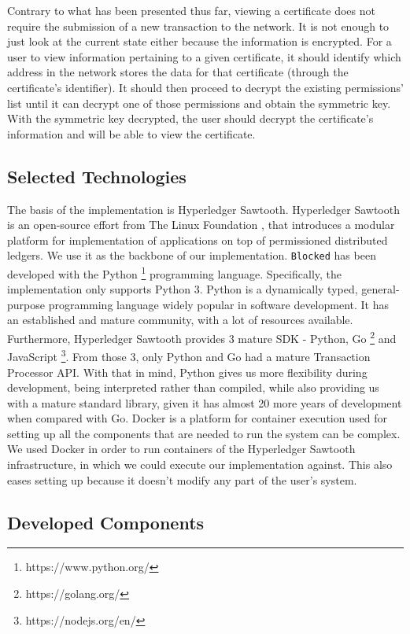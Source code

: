 Contrary to what has been presented thus far, viewing a certificate does not require the submission of a new transaction to the network. It is not enough to just look at the current state either because the information is encrypted. For a user to view information pertaining to a given certificate, it should identify which address in the network stores the data for that certificate (through the certificate's identifier). It should then proceed to decrypt the existing permissions' list until it can decrypt one of those permissions and obtain the symmetric key. With the symmetric key decrypted, the user should decrypt the certificate's information and will be able to view the certificate.

\subsection{Selected Technologies}
\label{sec:implementation-technology}

The basis of the implementation is Hyperledger Sawtooth. Hyperledger Sawtooth is an open-source effort from The Linux Foundation \cite{linuxfoundation}, that introduces a modular platform for implementation of applications on top of permissioned distributed ledgers. We use it as the backbone of our implementation. \texttt{Blocked} has been developed with the Python \footnote{https://www.python.org/} programming language. Specifically, the implementation only supports Python 3. Python is a dynamically typed, general-purpose programming language widely popular in software development. It has an established and mature community, with a lot of resources available. Furthermore, Hyperledger Sawtooth provides 3 mature SDK - Python, Go \footnote{https://golang.org/} and JavaScript \footnote{https://nodejs.org/en/}. From those 3, only Python and Go had a mature Transaction Processor API. With that in mind, Python gives us more flexibility during development, being interpreted rather than compiled, while also providing us with a mature standard library, given it has almost 20 more years of development when compared with Go. Docker is a platform for container execution used for setting up all the components that are needed to run the system can be complex. We used Docker in order to run containers of the Hyperledger Sawtooth infrastructure, in which we could execute our implementation against. This also eases setting up because it doesn't modify any part of the user's system.

\subsection{Developed Components}
\label{sec:implementation-core}

